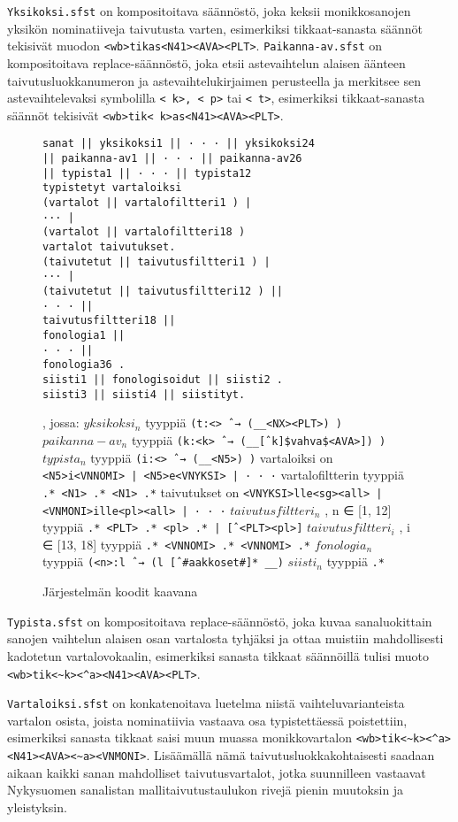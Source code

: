 \documentclass[free]{flammie}
\begin{document}
\texttt{Yksikoksi.sfst} on kompositoitava säännöstö, joka keksii monikkosanojen
yksikön nominatiiveja taivutusta varten, esimerkiksi tikkaat-sanasta säännöt
tekisivät muodon \texttt{<wb>tikas<N41><AVA><PLT>}.
\texttt{Paikanna-av.sfst} on kompositoitava replace-säännöstö, joka etsii astevaihtelun alaisen äänteen taivutusluokkanumeron ja astevaihtelukirjaimen perusteella
ja merkitsee sen astevaihtelevaksi symbolilla \texttt{<~k>, <~p>} tai
\texttt{<~t>}, esimerkiksi tikkaat-sanasta säännöt tekisivät
\texttt{<wb>tik<~k>as<N41><AVA><PLT>}.



\begin{figure}
    \caption{Järjestelmän koodit kaavana}
    \begin{verbatim}
sanat || yksikoksi1 || · · · || yksikoksi24
|| paikanna-av1 || · · · || paikanna-av26
|| typista1 || · · · || typista12
typistetyt vartaloiksi
(vartalot || vartalofiltteri1 ) |
··· |
(vartalot || vartalofiltteri18 )
vartalot taivutukset.
(taivutetut || taivutusfiltteri1 ) |
··· |
(taivutetut || taivutusfiltteri12 ) ||
· · · ||
taivutusfiltteri18 ||
fonologia1 ||
· · · ||
fonologia36 .
siisti1 || fonologisoidut || siisti2 .
siisti3 || siisti4 || siistityt.\end{verbatim}
, jossa: $yksikoksi_n$ tyyppiä
\verb|(t:<> ˆ→ (__<NX><PLT>) )|
$paikanna-av_n$ tyyppiä
\verb|(k:<k> ˆ→ (__[ˆk]$vahva$<AVA>]) )|
$typista_n$ tyyppiä
\verb|(i:<> ˆ→ (__<N5>) )|
vartaloiksi on
\verb_<N5>i<VNNOMI> | <N5>e<VNYKSI> | · · ·_
vartalofiltterin tyyppiä
\verb_.* <N1> .* <N1> .*_
taivutukset on
\verb_<VNYKSI>lle<sg><all> | <VNMONI>ille<pl><all> | · · ·_
$taivutusfiltteri_n$ , n ∈ [1, 12] tyyppiä
\verb_.* <PLT> .* <pl> .* | [ˆ<PLT><pl>]_
$taivutusfiltteri_i$ , i ∈ [13, 18] tyyppiä
\verb_.* <VNNOMI> .* <VNNOMI> .*_
$fonologia_n$ tyyppiä
\verb|(<n>:l ˆ→ (l [ˆ#aakkoset#]* __)|
$siisti_n$ tyyppiä
\verb_.*_
\end{figure}

\texttt{Typista.sfst} on kompositoitava replace-säännöstö, joka kuvaa sanaluokittain
sanojen vaihtelun alaisen osan vartalosta tyhjäksi ja ottaa muistiin
mahdollisesti kadotetun vartalovokaalin, esimerkiksi sanasta tikkaat säännöillä
tulisi muoto \verb|<wb>tik<~k><^a><N41><AVA><PLT>|.

\texttt{Vartaloiksi.sfst} on konkatenoitava luetelma niistä vaihteluvarianteista vartalon
osista, joista nominatiivia vastaava osa typistettäessä poistettiin, esimerkiksi
sanasta tikkaat saisi muun muassa monikkovartalon
\verb|<wb>tik<~k><^a><N41><AVA><~a><VNMONI>|. Lisäämällä nämä taivutusluokkakohtaisesti
saadaan aikaan kaikki sanan mahdolliset taivutusvartalot, jotka suunnilleen
vastaavat Nykysuomen sanalistan mallitaivutustaulukon rivejä pienin muutoksin ja
yleistyksin.
\end{document}
